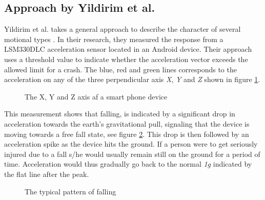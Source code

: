 \documentclass[12pt, a4paper, onecolumn]{article}
\begin{document}
	\subsection{Approach by Yildirim et al.}
	Yildirim et al. takes a general approach to describe the character of several motional types \cite{int_journ}. In their research, they measured the response from a LSM330DLC acceleration sensor located in an Android device. Their approach uses a threshold value to indicate whether the acceleration vector exceeds the allowed limit for a crash. The blue, red and green lines corresponds to the acceleration on any of the three perpendicular axis \textit{X}, \textit{Y} and \textit{Z} shown in figure \ref{fig:XYZ-Axis}.
	
	\begin{figure}[H]
		\centering
		\caption{The X, Y and Z axis af a smart phone device}%
		\label{fig:XYZ-Axis}%
	\end{figure}
	
	This measurement shows that falling, is indicated by a significant drop in acceleration towards the earth's gravitational pull, signaling that the device is moving towards a free fall state, see figure \ref{fig:Pattern-Falling}. This drop is then followed by an acceleration spike as the device hits the ground. If a person were to get seriously injured due to a fall s/he would usually remain still on the ground for a period of time. Acceleration would thus gradually go back to the normal \textit{1g} indicated by the flat line after the peak. 
	
	\begin{figure}[H]
		\centering
		\caption{The typical pattern of falling}%
		\label{fig:Pattern-Falling}%
	\end{figure}
	
\end{document}
